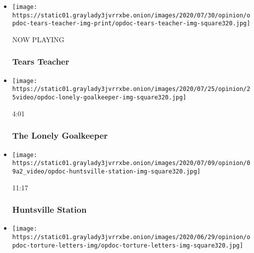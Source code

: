 \begin{itemize}
\item
  \texttt{[image: https://static01.graylady3jvrrxbe.onion/images/2020/07/30/opinion/opdoc-tears-teacher-img-print/opdoc-tears-teacher-img-square320.jpg]}

  NOW PLAYING

  \hypertarget{tears-teacher-2}{%
  \subsubsection{Tears Teacher}\label{tears-teacher-2}}
\item
  \href{https://www.nytimes3xbfgragh.onion/video/opinion/100000007229285/the-lonely-goalkeeper.html?action=click\&module=video-series-bar\&region=header\&pgtype=Article\&playlistId=video/op-docs}{}

  \texttt{[image: https://static01.graylady3jvrrxbe.onion/images/2020/07/25/opinion/25video/opdoc-lonely-goalkeeper-img-square320.jpg]}

  4:01

  \hypertarget{the-lonely-goalkeeper}{%
  \subsubsection{The Lonely Goalkeeper}\label{the-lonely-goalkeeper}}
\item
  \href{https://www.nytimes3xbfgragh.onion/video/opinion/100000007080462/huntsville-station.html?action=click\&module=video-series-bar\&region=header\&pgtype=Article\&playlistId=video/op-docs}{}

  \texttt{[image: https://static01.graylady3jvrrxbe.onion/images/2020/07/09/opinion/09a2\_video/opdoc-huntsville-station-img-square320.jpg]}

  11:17

  \hypertarget{huntsville-station}{%
  \subsubsection{Huntsville Station}\label{huntsville-station}}
\item
  \href{https://www.nytimes3xbfgragh.onion/video/opinion/100000007205588/the-torture-letters.html?action=click\&module=video-series-bar\&region=header\&pgtype=Article\&playlistId=video/op-docs}{}

  \texttt{[image: https://static01.graylady3jvrrxbe.onion/images/2020/06/29/opinion/opdoc-torture-letters-img/opdoc-torture-letters-img-square320.jpg]}


\end{itemize}
